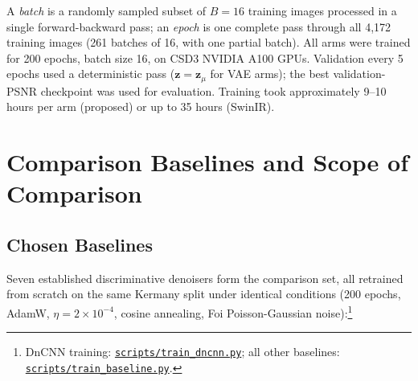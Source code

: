 \documentclass[12pt, a4paper, twoside, openright]{book}
\begin{document}
A \emph{batch} is a randomly sampled subset of $B=16$ training images processed in a single forward-backward pass; an \emph{epoch} is one complete pass through all 4,172 training images (261 batches of 16, with one partial batch). All arms were trained for 200 epochs, batch size 16, on CSD3 NVIDIA A100 GPUs. Validation every 5 epochs used a deterministic pass ($\mathbf{z}=\mathbf{z}_\mu$ for VAE arms); the best validation-PSNR checkpoint was used for evaluation. Training took approximately 9--10 hours per arm (proposed) or up to 35 hours (SwinIR).

\section{Comparison Baselines and Scope of Comparison}
\label{sec:methods:baselines}

\subsection{Chosen Baselines}
\label{sec:methods:baselines:chosen}

Seven established discriminative denoisers form the comparison set, all retrained from scratch on the same Kermany split under identical conditions (200 epochs, AdamW, $\eta{=}2\times10^{-4}$, cosine annealing, Foi Poisson-Gaussian noise):\footnote{DnCNN training: \href{https://github.com/teklesam/ppva_hformer_codebase/blob/main/scripts/train_dncnn.py}{\texttt{scripts/train\_dncnn.py}}; all other baselines: \href{https://github.com/teklesam/ppva_hformer_codebase/blob/main/scripts/train_baseline.py}{\texttt{scripts/train\_baseline.py}}.}
\end{document}
